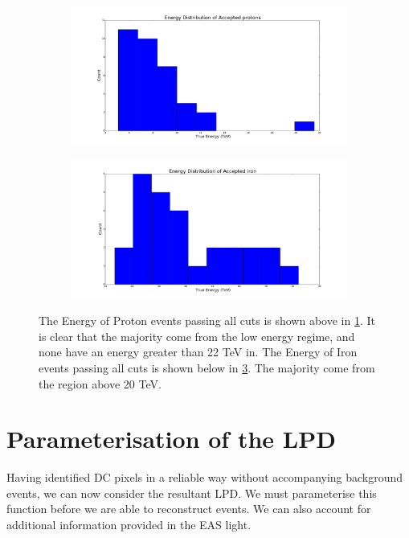 \documentclass[11pt]{article}
\begin{document}
\begin{figure}
	\centering
	\begin{subfigure}[b]{0.9\textwidth}
		\centering
		\includegraphics[width=\textwidth]{energyfullprotons}
		\caption{}
		\label{fig:protonenergy}
	\end{subfigure}
	\begin{subfigure}[b]{0.9\textwidth}
		\centering
		\includegraphics[width=\textwidth]{energyfulliron}
		\caption{}
		\label{fig:ironenergy}
	\end{subfigure}
	\caption{The Energy of Proton events passing all cuts is shown above in \ref{fig:protonenergy}. It is clear that the majority come from the low energy regime, and none have an energy greater than 22 TeV in. The Energy of Iron events passing all cuts is shown below in \ref{fig:ironenergy}. The majority come from the region above 20 TeV.}
\end{figure} 

\section{Parameterisation of the LPD}
Having identified DC pixels in a reliable way without accompanying background events, we can now consider the resultant LPD. We must parameterise this function before we are able to reconstruct events. We can also account for additional information provided in the EAS light.
\end{document}
